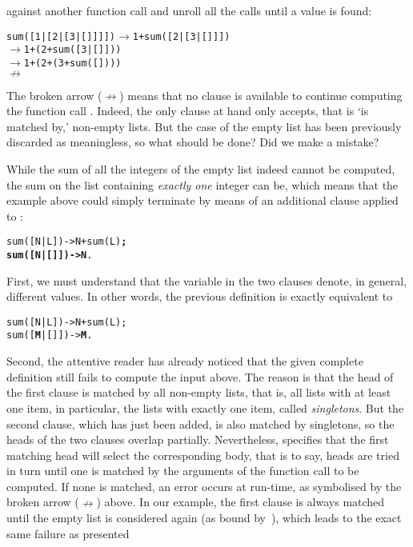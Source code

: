 against another function call and unroll all the calls until a value
is found:
\begin{alltt}
sum([1|[2|[3|[]]]]) \(\rightarrow\) 1 + sum([2|[3|[]]])
                    \(\rightarrow\) 1 + (2 + sum([3|[]]))
                    \(\rightarrow\) 1 + (2 + (3 + sum([])))
                    \(\nrightarrow\)
\end{alltt}
The broken arrow (\(\nrightarrow\))\label{broken_arrow} means that no
clause is available to continue computing the function call
. Indeed, the only clause at hand only accepts, that
is `is matched by,' non\hyp{}empty lists. But the case of the empty
list has been previously discarded as meaningless, so what should be
done? Did we make a mistake?

While the sum of all the integers of the empty list indeed cannot be
computed, the sum on the list containing \emph{exactly one} integer
can be, which means that the example above could simply terminate by
means of an additional clause applied to :
\begin{alltt}
sum([N| L]) -> N + sum(L)\textbf{;}
\textbf{sum([N|[]]) -> N}.\hfill% \emph{New clause for singletons}
\end{alltt}
First, we must understand that the variable  in the two
clauses denote, in general, different values. In other words, the
previous definition is exactly equivalent to
\begin{alltt}
sum([N| L]) -> N + sum(L);
sum([\textbf{M}|[]]) -> \textbf{M}.\hfill% \emph{Renaming}
\end{alltt}
Second, the attentive reader has already noticed that the given
complete definition still fails to compute the input above. The reason
is that the head of the first clause is matched by all non\hyp{}empty
lists, that is, all lists with at least one item, in particular, the
lists with exactly one item, called \emph{singletons}. But the second
clause, which has just been added, is also matched by singletons, so
the heads of the two clauses overlap partially. Nevertheless, \Erlang
specifies that the first matching head will select the corresponding
body, that is to say, heads are tried in turn until one is matched by
the arguments of the function call to be computed. If none is matched,
an error occurs at run\hyp{}time, as symbolised by the broken arrow
(\(\nrightarrow\)) above. In our example, the first clause is always
matched until the empty list is considered again (as bound
by~), which leads to the exact same failure as presented
